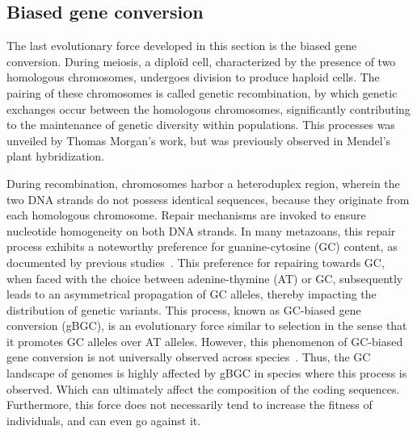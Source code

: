 \subsection{Biased gene conversion}

The last evolutionary force developed in this section is the \gls{biased gene conversion}. During meiosis, a \gls{diploïd} cell, characterized by the presence of two homologous chromosomes, undergoes division to produce haploid cells. The pairing of these chromosomes is called genetic recombination, by which genetic exchanges occur between the homologous chromosomes, significantly contributing to the maintenance of genetic diversity within populations. This processes was unveiled by Thomas Morgan's work, but was previously observed in Mendel's plant hybridization.

During recombination, chromosomes harbor a heteroduplex region, wherein the two \acrshort{DNA} strands do not possess identical sequences, because they originate from each homologous chromosome. Repair mechanisms are invoked to ensure nucleotide homogeneity on both DNA strands. In many metazoans, this repair process exhibits a noteworthy preference for guanine-cytosine (GC) content, as documented by previous studies~\citep{duret_impact_2008, duret_biased_2009, romiguier_contrasting_2010}. This preference for repairing towards GC, when faced with the choice between adenine-thymine (AT) or GC, subsequently leads to an asymmetrical propagation of GC alleles, thereby impacting the distribution of genetic variants. This process, known as GC-\gls{biased gene conversion} (\acrshort{gBGC}), is an evolutionary force similar to selection in the sense that it promotes GC alleles over AT alleles. However, this phenomenon of GC-\gls{biased gene conversion} is not universally observed across species~\citep{galtier_fine-scale_2021, mugal_systematic_2021}. Thus, the GC landscape of genomes is highly affected by \acrshort{gBGC} in species where this process is observed. Which can ultimately affect the composition of the coding sequences. Furthermore, this force does not necessarily tend to increase the fitness of individuals, and can even go against it.